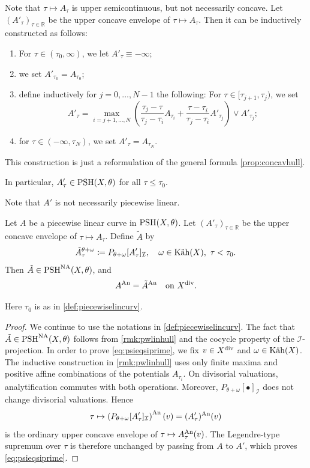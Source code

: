 \begin{remark}\label{rmk:pwlinhull}
Note that $\tau\mapsto A_{\tau}$ is upper semicontinuous, but not necessarily concave.
Let $(A'_{\tau})_{\tau\in \mathbb{R}}$ be the upper concave envelope of $\tau\mapsto A_{\tau}$. Then it can be inductively constructed as follows:
\begin{enumerate}
    \item\label{itm:rmk:pwlinhull:1} For $\tau \in (\tau_0,\infty)$, we let $A'_{\tau}\equiv -\infty$;
    \item\label{itm:rmk:pwlinhull:2} we set $A'_{\tau_0}=A_{\tau_0}$;
    \item\label{itm:rmk:pwlinhull:3} define inductively for $j=0,\ldots,N-1$ the following: For $\tau\in [\tau_{j+1},\tau_j)$, we set
    \[
    A'_{\tau}=\max_{i=j+1,\ldots,N}\left( \frac{\tau_j-\tau}{\tau_j-\tau_i}A_{\tau_i}+\frac{\tau-\tau_i}{\tau_j-\tau_i}A'_{\tau_j} \right)\lor A'_{\tau_j};
    \]
    \item\label{itm:rmk:pwlinhull:4} for $\tau\in (-\infty,\tau_N)$, we set $A'_{\tau}=A_{\tau_N}$.
\end{enumerate}
This construction is just a reformulation of the general formula \cref{prop:concavhull}.

In particular, $A'_{\tau}\in \PSH(X,\theta)$ for all $\tau\leq \tau_0$.

Note that $A'$ is not necessarily piecewise linear.
\end{remark}

\begin{lemma}\label{lma:psieqpsiprimeondiv}
Let $A$ be a piecewise linear curve in $\PSH(X,\theta)$. Let $(A'_{\tau})_{\tau\in \mathbb{R}}$ be the upper concave envelope of $\tau\mapsto A_{\tau}$. Define $\tilde A$ by
\[
    \tilde{A}^{\theta+\omega}_{\tau}\coloneqq P_{\theta+\omega}[A'_{\tau}]_{\mathcal I}, \quad \omega\in\Kah(X),\ \tau<\tau_0.
\]
Then $\tilde A\in\PSH^{\NA}(X,\theta)$, and
\begin{equation}\label{eq:psieqsiprime}
A^{\An}=\tilde{A}^{\An}\quad \text{on }X^{\Div}.
\end{equation}
\end{lemma}
Here $\tau_0$ is as in \cref{def:piecewiselincurv}.
\begin{proof}
We continue to use the notations in \cref{def:piecewiselincurv}. The fact that $\tilde{A}\in \PSH^{\NA}(X,\theta)$ follows from \cref{rmk:pwlinhull} and the cocycle property of the $\mathcal{I}$-projection. In order to prove \eqref{eq:psieqsiprime}, we fix $v\in X^{\Div}$ and $\omega\in\Kah(X)$.
The inductive construction in \cref{rmk:pwlinhull} uses only finite maxima and positive affine combinations of the potentials $A_{\tau_i}$. On divisorial valuations, analytification commutes with both operations.
Moreover, $P_{\theta+\omega}[\bullet]_{\mathcal I}$ does not change divisorial valuations. Hence
\[
\tau\mapsto \left(P_{\theta+\omega}[A'_\tau]_{\mathcal I}\right)^{\An}(v)= (A'_\tau)^{\An}(v)
\]
is the ordinary upper concave envelope of $\tau\mapsto A_\tau^{\An}(v)$. The Legendre-type supremum over $\tau$ is therefore unchanged by passing from $A$ to $A'$, which proves \eqref{eq:psieqsiprime}.
\end{proof}




